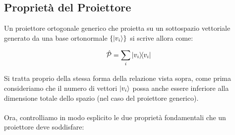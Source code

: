 \subsection{Proprietà del Proiettore}

	Un proiettore ortogonale generico che proietta su un sottospazio vettoriale generato da una base ortonormale $\qty{\ket{v_i}}$ si scrive allora come:

\begin{align*}
	\hat{\mathcal{P}} = \sum_i \ketbra{v_i}
\end{align*}
	
	Si tratta proprio della stessa forma della relazione vista sopra, come prima consideriamo che il numero di vettori $\ket{v_i}$ possa anche essere inferiore alla dimensione totale dello spazio (nel caso del proiettore generico).
	\\
	\\
	Ora, controlliamo in modo esplicito le due proprietà fondamentali che un proiettore deve soddisfare:
	

